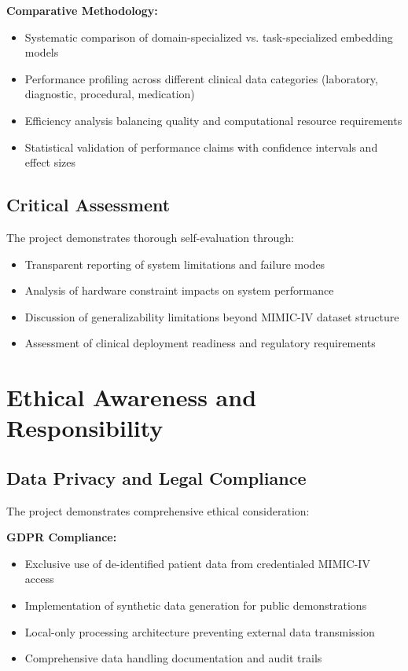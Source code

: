 \textbf{Comparative Methodology:}
\begin{itemize}
    \item Systematic comparison of domain-specialized vs. task-specialized embedding models
    \item Performance profiling across different clinical data categories (laboratory, diagnostic, procedural, medication)
    \item Efficiency analysis balancing quality and computational resource requirements
    \item Statistical validation of performance claims with confidence intervals and effect sizes
\end{itemize}

\subsection{Critical Assessment}
The project demonstrates thorough self-evaluation through:
\begin{itemize}
    \item Transparent reporting of system limitations and failure modes
    \item Analysis of hardware constraint impacts on system performance
    \item Discussion of generalizability limitations beyond MIMIC-IV dataset structure
    \item Assessment of clinical deployment readiness and regulatory requirements
\end{itemize}

\section{Ethical Awareness and Responsibility}

\subsection{Data Privacy and Legal Compliance}
The project demonstrates comprehensive ethical consideration:

\textbf{GDPR Compliance:}
\begin{itemize}
    \item Exclusive use of de-identified patient data from credentialed MIMIC-IV access
    \item Implementation of synthetic data generation for public demonstrations
    \item Local-only processing architecture preventing external data transmission
    \item Comprehensive data handling documentation and audit trails
\end{itemize}

